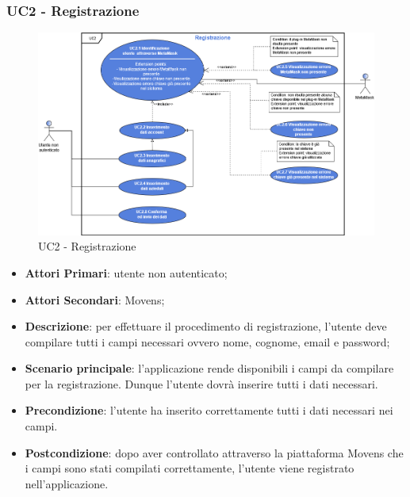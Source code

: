 \subsubsection{UC2 - Registrazione}
\begin{figure}[h]
	\includegraphics[width=16cm]{res/images/UC2Registrazione.png}
	\centering
	\caption{UC2 - Registrazione}
\end{figure}
\begin{itemize}
	\item \textbf{Attori Primari}: utente non autenticato;
	\item \textbf{Attori Secondari}: Movens\glo;
	\item \textbf{Descrizione}: per effettuare il procedimento di registrazione, l'utente deve compilare tutti i campi necessari ovvero nome, cognome, email e password;
	\item \textbf{Scenario principale}: l'applicazione rende disponibili i campi da compilare per la registrazione. Dunque l'utente dovrà inserire tutti i dati necessari.
		
	\item \textbf{Precondizione}: l'utente ha inserito correttamente tutti i dati necessari nei campi.
	\item \textbf{Postcondizione}: dopo aver controllato attraverso la piattaforma Movens che i campi sono stati compilati correttamente, l'utente viene registrato nell'applicazione. 
	
\end{itemize}
